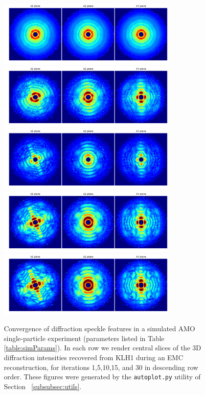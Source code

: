 \documentclass[]{iucr}              %
\begin{document}
\begin{figure}
\caption{Convergence of diffraction speckle features in a simulated AMO single-particle experiment (parameters listed in Table \ref{table:simParams}). In each row we render central slices of the 3D diffraction intensities recovered from KLH1 during an EMC reconstruction, for iterations 1,5,10,15, and 30 in descending row order. These figures were generated by the \texttt{autoplot.py} utility of Section ~\ref{subsubsec:utils}.}
\includegraphics[width=3.5in]{figures/amo_intens_001.png} 
\includegraphics[width=3.5in]{figures/amo_intens_005.png} 
\includegraphics[width=3.5in]{figures/amo_intens_010.png}
\includegraphics[width=3.5in]{figures/amo_intens_015.png} 
\includegraphics[width=3.5in]{figures/amo_intens_030.png} 
\end{figure}
\end{document}
